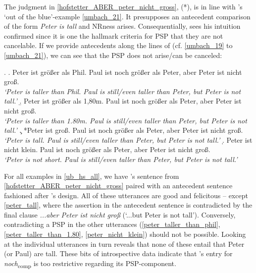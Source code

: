 \documentclass[output=paper,
modfonts
]{langscibook}
\begin{document}
\noindent The judgment in \ref{hofstetter_ABER_peter_nicht_gross}, (*), is in line with \citeauthor{umbach2009a_comp}'s \citeyearpar{umbach2009a_comp} `out of the blue'-example \ref{umbach_21}. It presupposes an antecedent comparison of the form \textit{Peter is tall} and NRness arises. Consequentially, \citet{Hofstetter2013} sees his intuition confirmed since it is one the hallmark criteria for PSP that they are not cancelable. If we provide antecedents along the lines of \citeauthor{umbach2009a_comp} (cf. \ref{umbach_19} to \ref{umbach_21}), we can see that the PSP does not arise/can be canceled: 

\ex.\footnotesize \label{ub_hs_all} \a. Peter ist größer als Phil. Paul ist noch größer als Peter, aber Peter ist nicht groß.\label{peter_taller_than_phil} \\ \textit{`Peter is taller than Phil. Paul is still/even taller than Peter, but Peter is not tall.'} \vspace{6pt}
\b. Peter ist größer als 1,80m.  Paul ist noch größer als Peter, aber Peter ist nicht groß.\label{peter_taller_than_1.80}\\ \textit{`Peter is taller than 1.80m. Paul is still/even taller than Peter, but Peter is not tall.'} \vspace{6pt}
\c. *Peter ist groß. Paul ist noch größer als Peter, aber Peter ist nicht groß.\label{peter_tall}\\ \textit{`Peter is tall. Paul is still/even taller than Peter, but Peter is not tall.'} \vspace{6pt}
\d. Peter ist nicht klein. Paul ist noch größer als Peter, aber Peter ist nicht groß.\label{peter_nicht_klein}\\ \textit{`Peter is not short. Paul is still/even taller than Peter, but Peter is not tall.'}

For all examples in \ref{ub_hs_all}, we have \citeauthor{Hofstetter2013}'s sentence from \ref{hofstetter_ABER_peter_nicht_gross} paired with an antecedent sentence fashioned after \citeauthor{umbach2009a_comp}'s design. All of these utterances are good and felicitous -- except \ref{peter_tall}, where the assertion in the antecedent sentence is contradicted by the final clause \textit{...aber Peter ist nicht groß} (`...but Peter is not tall'). Conversely, contradicting a PSP in the other utterances (\ref{peter_taller_than_phil}, \ref{peter_taller_than_1.80}, \ref{peter_nicht_klein}) should not be possible. Looking at the individual utterances in turn reveals that none of these entail that Peter (or Paul) are tall. These bits of introspective data indicate that \citeauthor{Hofstetter2013}'s entry for \textit{noch}\textsubscript{comp} is too restrictive regarding its PSP-component. 
\end{document}
